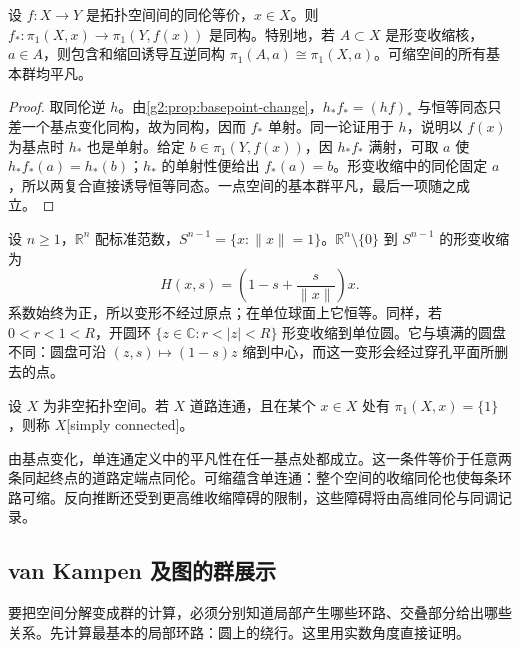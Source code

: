 \begin{proposition}\label{g2:prop:pi-one-homotopy-invariance}
	设 \(f:X\rightarrow Y\) 是拓扑空间间的同伦等价，\(x\in X\)。则 \(f_*:\pi_1(X,x)\rightarrow\pi_1(Y,f(x))\) 是同构。特别地，若 \(A\subset X\) 是形变收缩核，\(a\in A\)，则包含和缩回诱导互逆同构 \(\pi_1(A,a)\cong\pi_1(X,a)\)。可缩空间的所有基本群均平凡。
\end{proposition}
\begin{proof}
	取同伦逆 \(h\)。由\cref{g2:prop:basepoint-change}，\(h_*f_*=(hf)_*\) 与恒等同态只差一个基点变化同构，故为同构，因而 \(f_*\) 单射。同一论证用于 \(h\)，说明以 \(f(x)\) 为基点时 \(h_*\) 也是单射。给定 \(b\in\pi_1(Y,f(x))\)，因 \(h_*f_*\) 满射，可取 \(a\) 使 \(h_*f_*(a)=h_*(b)\)；\(h_*\) 的单射性便给出 \(f_*(a)=b\)。形变收缩中的同伦固定 \(a\)，所以两复合直接诱导恒等同态。一点空间的基本群平凡，最后一项随之成立。
\end{proof}

\begin{example}\label{g2:exm:radial-retraction}
	设 \(n\geq1\)，\(\mathbb R^n\) 配标准范数，\(S^{n-1}=\{x:\lVert x\rVert=1\}\)。\(\mathbb R^n\setminus\{0\}\) 到 \(S^{n-1}\) 的形变收缩为
	\[
		H(x,s)=\left(1-s+\frac{s}{\lVert x\rVert}\right)x.
	\]
	系数始终为正，所以变形不经过原点；在单位球面上它恒等。同样，若 \(0<r<1<R\)，开圆环 \(\{z\in\mathbb C:r<|z|<R\}\) 形变收缩到单位圆。它与填满的圆盘不同：圆盘可沿 \((z,s)\mapsto(1-s)z\) 缩到中心，而这一变形会经过穿孔平面所删去的点。
\end{example}

\begin{definition}[单连通空间]\label{g2:def:simply-connected}
	设 \(X\) 为非空拓扑空间。若 \(X\) 道路连通，且在某个 \(x\in X\) 处有 \(\pi_1(X,x)=\{1\}\)，则称 \(X\)[simply connected]。
\end{definition}

由基点变化，单连通定义中的平凡性在任一基点处都成立。这一条件等价于任意两条同起终点的道路定端点同伦。可缩蕴含单连通：整个空间的收缩同伦也使每条环路可缩。反向推断还受到更高维收缩障碍的限制，这些障碍将由高维同伦与同调记录。

\subsection{van Kampen 及图的群展示}
\label{g2:subsec:0101:02}
要把空间分解变成群的计算，必须分别知道局部产生哪些环路、交叠部分给出哪些关系。先计算最基本的局部环路：圆上的绕行。这里用实数角度直接证明。

